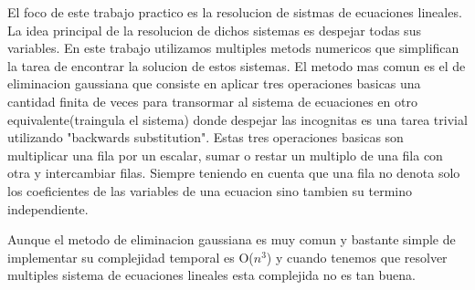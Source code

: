 El foco de este trabajo practico es la resolucion de sistmas de ecuaciones lineales. La idea principal de la resolucion de dichos sistemas es despejar todas sus variables. 
En este trabajo utilizamos multiples metods numericos que simplifican la tarea de encontrar la solucion de estos sistemas. 
El metodo mas comun es el de eliminacion gaussiana que consiste en aplicar tres operaciones basicas una cantidad finita de veces para transormar al sistema de ecuaciones en otro equivalente(traingula el sistema) donde despejar las incognitas es una tarea trivial utilizando "backwards substitution". 
Estas tres operaciones basicas son multiplicar una fila por un escalar, sumar o restar un multiplo de una fila con otra y intercambiar filas. 
Siempre teniendo en cuenta que una fila no denota solo los coeficientes de las variables de una ecuacion sino tambien su termino independiente.\par
\indent Aunque el metodo de eliminacion gaussiana es muy comun y bastante simple de implementar su complejidad temporal es O($n^{3}$) y cuando tenemos que resolver multiples sistema de ecuaciones lineales esta complejida no es tan buena. 

